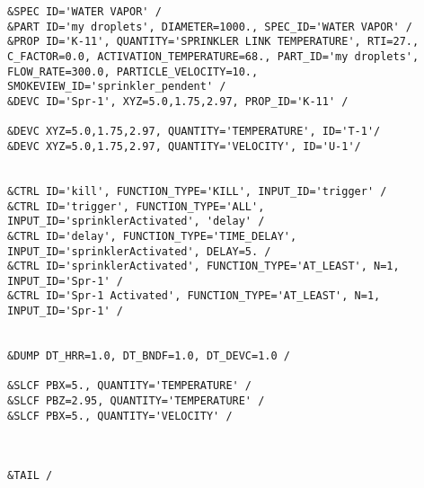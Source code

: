 \begin{lstlisting}[emptylines=0,basicstyle=\tiny]
&SPEC ID='WATER VAPOR' /
&PART ID='my droplets', DIAMETER=1000., SPEC_ID='WATER VAPOR' /
&PROP ID='K-11', QUANTITY='SPRINKLER LINK TEMPERATURE', RTI=27., C_FACTOR=0.0, ACTIVATION_TEMPERATURE=68., PART_ID='my droplets', FLOW_RATE=300.0, PARTICLE_VELOCITY=10., SMOKEVIEW_ID='sprinkler_pendent' /
&DEVC ID='Spr-1', XYZ=5.0,1.75,2.97, PROP_ID='K-11' /

&DEVC XYZ=5.0,1.75,2.97, QUANTITY='TEMPERATURE', ID='T-1'/
&DEVC XYZ=5.0,1.75,2.97, QUANTITY='VELOCITY', ID='U-1'/


&CTRL ID='kill', FUNCTION_TYPE='KILL', INPUT_ID='trigger' /
&CTRL ID='trigger', FUNCTION_TYPE='ALL', INPUT_ID='sprinklerActivated', 'delay' /
&CTRL ID='delay', FUNCTION_TYPE='TIME_DELAY', INPUT_ID='sprinklerActivated', DELAY=5. /
&CTRL ID='sprinklerActivated', FUNCTION_TYPE='AT_LEAST', N=1, INPUT_ID='Spr-1' /
&CTRL ID='Spr-1 Activated', FUNCTION_TYPE='AT_LEAST', N=1, INPUT_ID='Spr-1' /


&DUMP DT_HRR=1.0, DT_BNDF=1.0, DT_DEVC=1.0 /

&SLCF PBX=5., QUANTITY='TEMPERATURE' /
&SLCF PBZ=2.95, QUANTITY='TEMPERATURE' /
&SLCF PBX=5., QUANTITY='VELOCITY' /



&TAIL /

    
\end{lstlisting}

